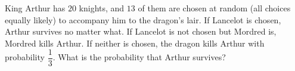 King Arthur has $20$ knights, and $13$ of them are chosen at random (all choices equally likely) to accompany him to the dragon's lair. If Lancelot is chosen, Arthur survives no matter what. If Lancelot is not chosen but Mordred is, Mordred kills Arthur. If neither is chosen, the dragon kills Arthur with probability $\dfrac13$. What is the probability that Arthur survives?
